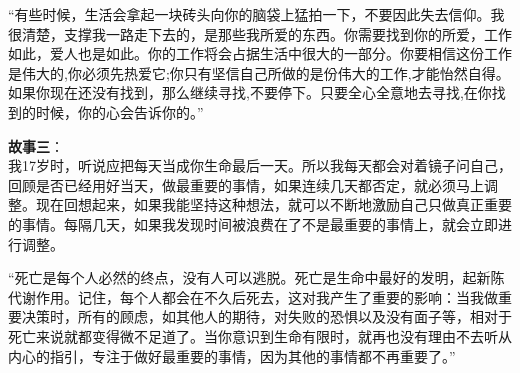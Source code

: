 “有些时候，生活会拿起一块砖头向你的脑袋上猛拍一下，不要因此失去信仰。我很清楚，支撑我一路走下去的，是那些我所爱的东西。你需要找到你的所爱，工作如此，爱人也是如此。你的工作将会占据生活中很大的一部分。你要相信这份工作是伟大的,你必须先热爱它;你只有坚信自己所做的是份伟大的工作,才能怡然自得。如果你现在还没有找到，那么继续寻找,不要停下。只要全心全意地去寻找,在你找到的时候，你的心会告诉你的。” 

\textbf{故事三}：\\
我17岁时，听说应把每天当成你生命最后一天。所以我每天都会对着镜子问自己，回顾是否已经用好当天，做最重要的事情，如果连续几天都否定，就必须马上调整。现在回想起来，如果我能坚持这种想法，就可以不断地激励自己只做真正重要的事情。每隔几天，如果我发现时间被浪费在了不是最重要的事情上，就会立即进行调整。

“死亡是每个人必然的终点，没有人可以逃脱。死亡是生命中最好的发明，起新陈代谢作用。记住，每个人都会在不久后死去，这对我产生了重要的影响：当我做重要决策时，所有的顾虑，如其他人的期待，对失败的恐惧以及没有面子等，相对于死亡来说就都变得微不足道了。当你意识到生命有限时，就再也没有理由不去听从内心的指引，专注于做好最重要的事情，因为其他的事情都不再重要了。”


